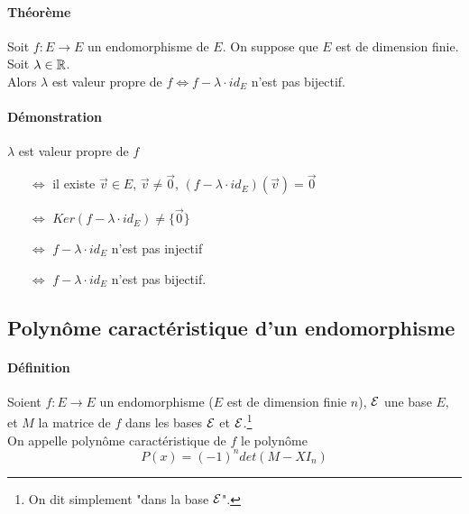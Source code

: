 \begin{enumerate}
\end{enumerate}

\paragraph{Théorème} Soit $f: E \rightarrow E$ un endomorphisme de $E$. On suppose que $E$ est de dimension finie. Soit $\lambda \in \mathbb{R}$. \\
Alors $\lambda$ est valeur propre de $f \Leftrightarrow f- \lambda \cdot id_E$ n'est pas bijectif.
      
\paragraph{Démonstration} $\lambda$ est valeur propre de $f$
\begin{itemize}
  \item[$\Leftrightarrow$] il existe $\vec{v} \in E$, $\vec{v} \neq \vec{0}$, $(f - \lambda \cdot id_E)(\vec{v}) = \vec{0}$ 
  \item[$\Leftrightarrow$] $Ker(f-\lambda\cdot id_E) \neq \{\vec{0}\}$
  \item[$\Leftrightarrow$] $f-\lambda \cdot id_E$ n'est pas injectif 
  \item[$\Leftrightarrow$] $f-\lambda \cdot id_E$ n'est pas bijectif.
\end{itemize}

%
\subsection{Polynôme caractéristique d'un endomorphisme}
%
\paragraph{Définition} Soient $f: E \rightarrow E$ un endomorphisme ($E$ est de dimension finie $n$), $\mathcal{E}$ une base $E$, et $M$ la matrice de $f$ dans les bases $\mathcal{E}$ et $\mathcal{E}$.\footnote{On dit simplement "dans la base $\mathcal{E}$".} \\
On appelle polynôme caractéristique de $f$ le polynôme
$$P(x) = (-1)^{n} det(M - X I_n)$$

